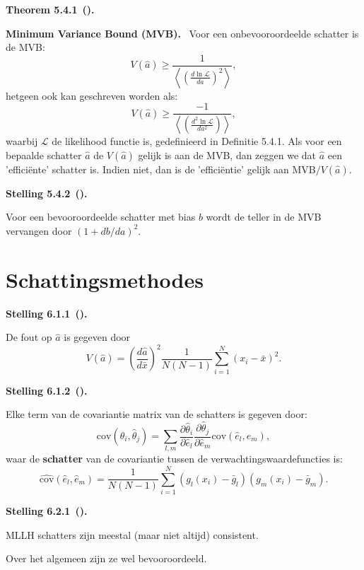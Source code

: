 \documentclass[10pt,a4paper]{article}
\newenvironment{res}[3][]{%
  \begin{tcolorbox}[
    breakable,          %
    colback=gray!10,    %
    colframe=gray!40,   %
    boxrule=0.5pt,      %
    left=6pt, right=6pt, top=6pt, bottom=6pt %
  ]
  \noindent\textbf{#2 #3}\if\relax\detokenize{#1}\relax\else\ \textbf{(#1)}\fi\textbf{.}~\ignorespaces
}{%
  \end{tcolorbox}
}
\newcommand{\restitle}[1]{\textbf{#1.}\ }
\begin{document}
\begin{res}{Theorem}{5.4.1}
\restitle{Minimum Variance Bound (MVB)}
Voor een onbevooroordeelde schatter is de MVB:
\[
V(\hat a) \ge \frac{1}{\left\langle \left(\frac{d\ln\mathcal L}{da}\right)^2\right\rangle},
\]
hetgeen ook kan geschreven worden als:
\[
V(\hat a) \ge \frac{-1}{\left\langle \left(\frac{d^2\ln\mathcal L}{da^2}\right)\right\rangle},
\]
waarbij $\mathcal L$ de likelihood functie is, gedefinieerd in Definitie 5.4.1. Als voor een bepaalde schatter $\hat a$ de $V(\hat a)$ gelijk is aan de MVB, dan zeggen we dat $\hat a$ een 'effici\"ente' schatter is. Indien niet, dan is de 'effici\"entie' gelijk aan MVB$/V(\hat a)$.
\end{res}

\begin{res}{Stelling}{5.4.2}
Voor een bevooroordeelde schatter met bias $b$ wordt de teller in de MVB vervangen door $(1+db/da)^2$.
\end{res}

\section{Schattingsmethodes}

\begin{res}{Stelling}{6.1.1}
De fout op $\hat a$ is gegeven door
\[
V(\hat a) = \left(\frac{d\hat a}{d\bar x}\right)^2 \frac{1}{N(N-1)}\sum_{i=1}^N (x_i-\bar x)^2.
\]
\end{res}

\begin{res}{Stelling}{6.1.2}
Elke term van de covariantie matrix van de schatters is gegeven door:
\[
\mathrm{cov}(\hat\theta_i,\hat\theta_j) = \sum_{l,m} \frac{\partial\hat\theta_i}{\partial\hat e_l}\frac{\partial\hat\theta_j}{\partial\hat e_m}\mathrm{cov}(\hat e_l,\hat e_m),
\]
waar de \textbf{schatter} van de covariantie tussen de verwachtingswaardefuncties is:
\[
\widehat{\mathrm{cov}}(\hat e_l,\hat e_m) = \frac{1}{N(N-1)}\sum_{i=1}^N (g_l(x_i)-\bar g_l)(g_m(x_i)-\bar g_m).
\]
\end{res}

\begin{res}{Stelling}{6.2.1}
MLLH schatters zijn meestal (maar niet altijd) consistent.

Over het algemeen zijn ze wel bevooroordeeld.
\end{res}
\end{document}
